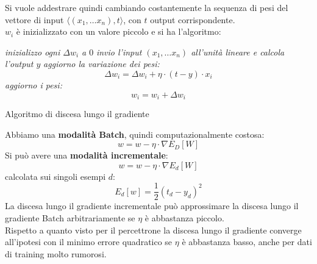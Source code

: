 \documentclass[a4paper,12pt, oneside]{book}
\begin{document}
Si vuole addestrare quindi cambiando costantemente la sequenza di pesi del
vettore di input $\langle( x_1, \ldots x_n),t\rangle$, con $t$ output
corrispondente.\\
$w_i$ è inizializzato con un valore piccolo e si ha l'algoritmo:
\begin{algorithm}[H]
  \begin{algorithmic}
    \State \textit{inizializzo ogni $\Delta w_i$ a $0$}
    \State \textit{invio l'input $( x_1, \ldots x_n)$ all'unità lineare e
    calcola l'output $y$} 
    \State \textit{aggiorno la variazione dei pesi:}
    \[\Delta w_i=\Delta w_i+\eta\cdot (t-y)\cdot x_i\]
    \EndFor
    \State \textit{aggiorno i pesi:}
    \[w_i=w_i+\Delta w_i\]
    \EndFunction
  \end{algorithmic}
  \caption{Algoritmo di discesa lungo il gradiente}
\end{algorithm}
Abbiamo una \textbf{modalità Batch}, quindi computazionalmente costosa:
\[w=w-\eta\cdot\nabla E_D[W]\]
Si può avere una \textbf{modalità incrementale}:
\[w=w-\eta\cdot\nabla E_d[W]\]
calcolata sui singoli esempi $d$:
\[E_d[w]=\frac{1}{2}(t_d-y_d)^2\]
La discesa lungo il gradiente incrementale può approssimare la discesa lungo
il gradiente Batch arbitrariamente se $\eta$ è abbastanza piccolo.\\
Rispetto a quanto visto per il percettrone la discesa lungo il gradiente
converge all'ipotesi con il minimo errore quadratico se  $\eta$ è abbastanza
basso, anche per dati di training molto rumorosi.
\end{document}
